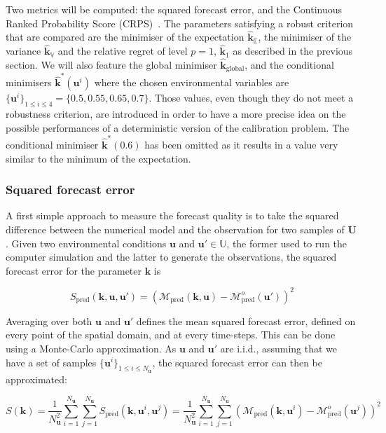 \documentclass[preprint, review, 1p]{elsarticle}
\newcommand{\Ex}{\mathbb{E}}
\newcommand{\hatkmean}{\hat{\mathbf{k}}_{\Ex}}
\newcommand{\hatkvar}{\hat{\mathbf{k}}_{\mathbb{V}}}
\newcommand{\kest}{\hat{\mathbf{k}}}
\newcommand{\Uspace}{\mathbb{U}}
\begin{document}
Two metrics will be computed: the squared forecast error, and the Continuous Ranked Probability Score (CRPS)~\citep{gneiting_probabilistic_2014}. The parameters satisfying a robust criterion that are compared are the minimiser of the expectation $\hatkmean$, the minimiser of the variance $\hatkvar$ and the relative regret of level $p=1$, $\kest_1$ as described in the previous section.
We will also feature the global minimiser $\kest_{\mathrm{global}}$, and the conditional minimisers $\kest^*(\mathbf{u}^i)$ where the chosen environmental variables are $\{\mathbf{u}^i\}_{1\leq i \leq 4} = \{0.5, 0.55, 0.65, 0.7\}$. Those values, even though they do not meet a robustness criterion, are introduced in order to have a more precise idea on the possible performances of a deterministic version of the calibration problem.
The conditional minimiser $\kest^*(0.6)$ has been omitted as it results in a value very similar to the minimum of the expectation.

\subsubsection{Squared forecast error}
A first simple approach to measure the forecast quality is to take the squared difference between the numerical model and the observation for two samples of $\mathbf{U}$.
Given two environmental conditions $\mathbf{u}$ and $\mathbf{u}'\in \Uspace$, the former used to run the computer simulation and the latter to generate the observations, the squared forecast error for the parameter $\mathbf{k}$ is

\begin{equation}
\label{eq:squared_forecast_error}
S_{\mathrm{pred}}(\mathbf{k},\mathbf{u},\mathbf{u}') = \left(\mathcal{M}_{\mathrm{pred}}(\mathbf{k},\mathbf{u}) - \mathcal{M}^{o}_{\mathrm{pred}}(\mathbf{u}')\right)^2
\end{equation}

Averaging over both $\mathbf{u}$ and $\mathbf{u}'$ defines the mean squared forecast error, defined on every point of the spatial domain, and at every time-steps. This can be done using a Monte-Carlo approximation. As $\mathbf{u}$ and $\mathbf{u}'$ are i.i.d., assuming that we have a set of samples $\{\mathbf{u}^i\}_{1\leq i \leq N_{\mathbf{u}}}$, the squared forecast error can then be approximated:

\begin{equation}
  \label{eq:squared_forecast_error_averaged}
  S(\mathbf{k}) = \frac{1}{N_{\mathbf{u}}^2 }\sum_{i=1}^{N_{\mathbf{u}}}\sum_{j=1}^{N_{\mathbf{u}}} S_{\mathrm{pred}}(\mathbf{k},\mathbf{u}^i,\mathbf{u}^j) = \frac{1}{N_{\mathbf{u}}^2 }\sum_{i=1}^{N_{\mathbf{u}}}\sum_{j=1}^{N_{\mathbf{u}}}  \left(\mathcal{M}_{\mathrm{pred}}(\mathbf{k},\mathbf{u}^i) - \mathcal{M}^{o}_{\mathrm{pred}}(\mathbf{u}^j)\right)^2
\end{equation}
\end{document}

